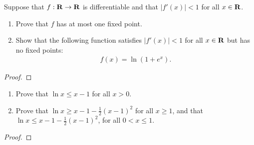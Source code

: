 \documentclass[11pt,twoside,openany]{memoir}
\begin{document}
\newpage
\fancyhead[L]{\scalebox{0.9}{Derivatives and the Mean Value Theorem}}
\fancyhead[R]{\scalebox{0.9}{Appeared on: S18}}
\begin{problem}
    Suppose that $f:\mathbf{R} \rightarrow \mathbf{R}$ is differentiable and that $|f'(x)| < 1$ for all $x \in \mathbf{R}$. 
    \begin{enumerate}[label = (\arabic*)]
        \item Prove that $f$ has at most one fixed point.
        \item Show that the following function satisfies $|f'(x)| < 1$ for all $x \in \mathbf{R}$ but has no fixed points:
        \begin{equation*}
        \begin{split}
            f(x) = \ln(1+e^x).
        \end{split}
        \end{equation*}
    \end{enumerate}
\end{problem}
\begin{proof}
\end{proof}

\newpage
\fancyhead[L]{\scalebox{0.9}{Derivatives and the Mean Value Theorem}}
\fancyhead[R]{\scalebox{0.9}{Appeared on: F16}}
\begin{problem}
    \phantom{a}
    \begin{enumerate}[label = (\arabic*)]
        \item Prove that $\ln x \leq x-1$ for all $x > 0$.
        \item Prove that $\ln x \geq x - 1 - \frac{1}{2}(x-1)^2$ for all $x \geq 1$, and that $\ln x \leq x - 1 - \frac{1}{2}(x-1)^2$, for all $0 < x \leq 1$.
    \end{enumerate}
\end{problem}
\begin{proof}
\end{proof}
\end{document}
